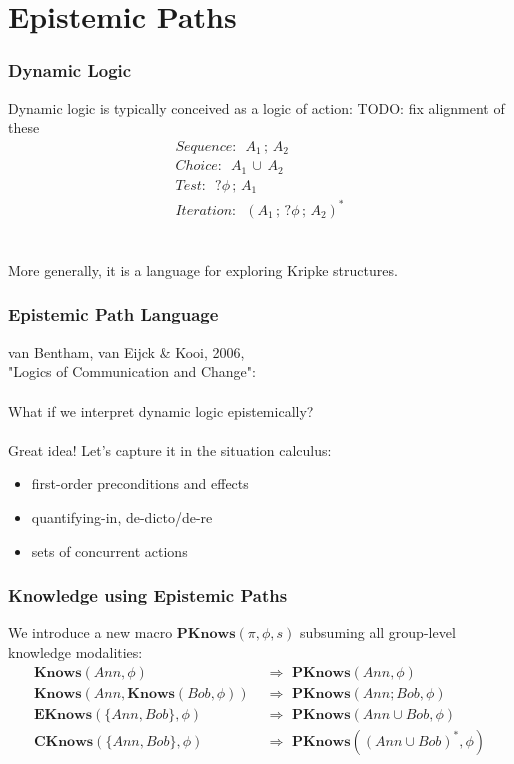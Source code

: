 \documentclass[compress]{beamer}
\newcommand{\EKnows}{\mathbf{EKnows}}
\newcommand{\Knows}{\mathbf{Knows}}
\newcommand{\CKnows}{\mathbf{CKnows}}
\newcommand{\PKnows}{\mathbf{PKnows}}
\begin{document}
\section{Epistemic Paths}

\begin{frame}
\frametitle{Dynamic Logic}
Dynamic logic is typically conceived as a logic of action:
TODO: fix alignment of these
\begin{gather*}
Sequence: \,\,\, A_1\,;\,A_2 \\
Choice: \,\,\, A_1\,\cup\,A_2 \\
Test: \,\,\, ?\phi\,;\,A_1 \\
Iteration: \,\,\, (A_1\,;\,?\phi\,;\,A_2)^*
\end{gather*}
\ \\
\ \\
\pause
More generally, it is a language for exploring Kripke structures.
\end{frame}

\begin{frame}
\frametitle{Epistemic Path Language}
van Bentham, van Eijck \& Kooi, 2006,\\
"Logics of Communication and Change":
\ \\
\ \\
What if we interpret dynamic logic epistemically?
\ \\
\ \\
\pause
Great idea!  Let's capture it in the situation calculus:
\begin{itemize}
\item first-order preconditions and effects
\item quantifying-in, de-dicto/de-re
\item sets of concurrent actions
\end{itemize}
\end{frame}

\begin{frame}
\frametitle{Knowledge using Epistemic Paths}
We introduce a new macro $\PKnows(\pi,\phi,s)$ subsuming all group-level knowledge modalities:
\begin{align*}
\Knows(Ann,\phi) &  \,\,\Rightarrow\,\,\PKnows(Ann,\phi) \\
\Knows(Ann,\Knows(Bob,\phi)) & \,\,\Rightarrow\,\,\PKnows(Ann ; Bob,\phi) \\
\EKnows(\{Ann,Bob\},\phi) & \,\,\Rightarrow\,\,\PKnows(Ann \cup Bob,\phi) \\
\CKnows(\{Ann,Bob\},\phi) & \,\,\Rightarrow\,\,\PKnows((Ann \cup Bob)^*,\phi)
\end{align*}
\end{frame}
\end{document}
